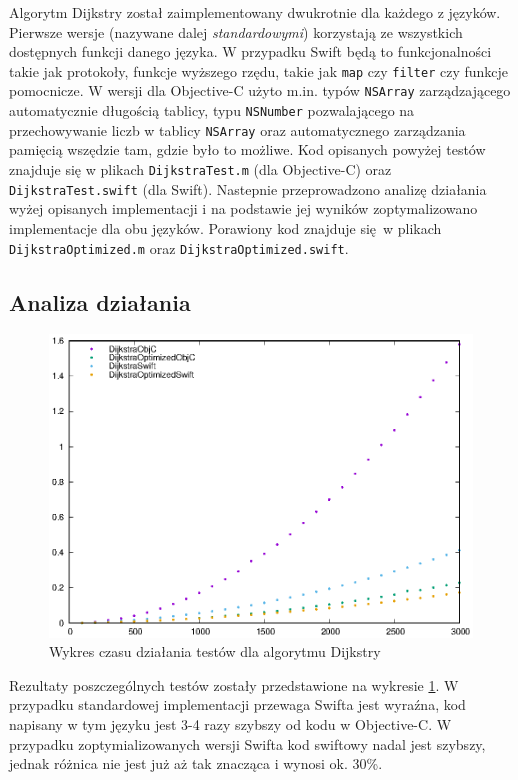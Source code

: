 \documentclass[mgr, shortabstract]{iithesis}
\newcommand{\swiftinline}[1]{
    \texttt{#1}
}
\newcommand{\objcinline}[1]{
    \texttt{#1}
}
\begin{document}
Algorytm Dijkstry został zaimplementowany dwukrotnie dla każdego z języków. Pierwsze wersje (nazywane dalej \textit{standardowymi}) korzystają ze wszystkich dostępnych funkcji danego języka. W przypadku Swift będą to funkcjonalności takie jak protokoły, funkcje wyższego rzędu, takie jak \swiftinline{map} czy \swiftinline{filter} czy funkcje pomocnicze. W wersji dla Objective-C użyto m.in. typów \objcinline{NSArray} zarządzającego automatycznie długością tablicy, typu \objcinline{NSNumber} pozwalającego na przechowywanie liczb w tablicy \objcinline{NSArray} oraz automatycznego zarządzania pamięcią wszędzie tam, gdzie było to możliwe. Kod opisanych powyżej testów znajduje się w plikach \texttt{DijkstraTest.m} (dla Objective-C) oraz \texttt{DijkstraTest.swift} (dla Swift). Nastepnie przeprowadzono analizę działania wyżej opisanych implementacji i na podstawie jej wyników zoptymalizowano implementacje dla obu języków. Porawiony kod znajduje się w plikach \texttt{DijkstraOptimized.m} oraz \texttt{DijkstraOptimized.swift}.

\subsection{Analiza działania}

\begin{figure}
    \includegraphics{plots/Dijkstra}
    \caption{Wykres czasu działania testów dla algorytmu Dijkstry}
    \label{p:dijkstra}
\end{figure}

Rezultaty poszczególnych testów zostały przedstawione na wykresie \ref{p:dijkstra}. W przypadku standardowej implementacji przewaga Swifta jest wyraźna, kod napisany w tym języku jest 3-4 razy szybszy od kodu w Objective-C. W przypadku zoptymializowanych wersji Swifta kod swiftowy nadal jest szybszy, jednak różnica nie jest już aż tak znacząca i wynosi ok. 30\%.
\end{document}
